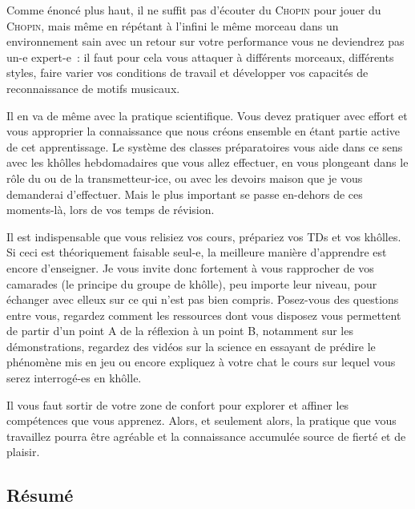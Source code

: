 Comme énoncé plus haut, il ne suffit pas d'écouter du \textsc{Chopin} pour jouer
du \textsc{Chopin}, mais même en répétant à l'infini le même morceau dans un
environnement sain avec un retour sur votre performance vous ne deviendrez pas
un-e expert-e~: il faut pour cela vous attaquer à différents morceaux,
différents styles, faire varier vos conditions de travail et développer vos
capacités de reconnaissance de motifs musicaux.

Il en va de même avec la pratique scientifique. Vous devez pratiquer avec effort
et vous approprier la connaissance que nous créons ensemble en étant partie
active de cet apprentissage. Le système des classes préparatoires vous aide dans
ce sens avec les khôlles hebdomadaires que vous allez effectuer, en vous
plongeant dans le rôle du ou de la transmetteur-ice, ou avec les devoirs maison
que je vous demanderai d'effectuer. Mais le plus important se passe en-dehors de
ces moments-là, lors de vos temps de révision.

Il est indispensable que vous relisiez vos cours, prépariez vos TDs et vos
khôlles. Si ceci est théoriquement faisable seul-e, la meilleure manière
d'apprendre est encore d'enseigner. Je vous invite donc fortement à vous
rapprocher de vos camarades (le principe du groupe de khôlle), peu importe leur
niveau, pour échanger avec elleux sur ce qui n'est pas bien compris. Posez-vous
des questions entre vous, regardez comment les ressources dont vous disposez
vous permettent de partir d'un point A de la réflexion à un point B, notamment
sur les démonstrations, regardez des vidéos sur la science en essayant de
prédire le phénomène mis en jeu ou encore expliquez à votre chat le cours sur
lequel vous serez interrogé-es en khôlle.

Il vous faut sortir de votre zone de confort pour explorer et affiner les
compétences que vous apprenez. Alors, et seulement alors, la pratique que vous
travaillez pourra être agréable et la connaissance accumulée source de fierté et
de plaisir.

\subsection{Résumé}

